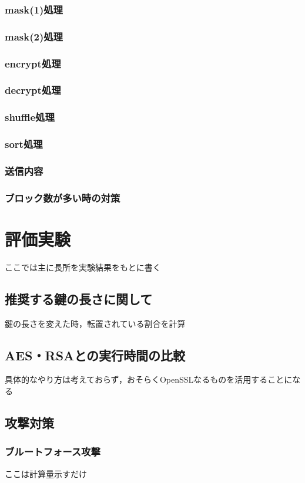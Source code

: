 \documentclass{jsarticle}
\begin{document}
\subsubsection{mask(1)処理}
\subsubsection{mask(2)処理}
\subsubsection{encrypt処理}
\subsubsection{decrypt処理}
\subsubsection{shuffle処理}
\subsubsection{sort処理}
\subsubsection{送信内容}
\subsubsection{ブロック数が多い時の対策}

\section{評価実験}
ここでは主に長所を実験結果をもとに書く
\subsection{推奨する鍵の長さに関して}
鍵の長さを変えた時，転置されている割合を計算
\subsection{AES・RSAとの実行時間の比較}
具体的なやり方は考えておらず，おそらくOpenSSLなるものを活用することになる
\subsection{攻撃対策}
\subsubsection{ブルートフォース攻撃}
ここは計算量示すだけ
\end{document}
